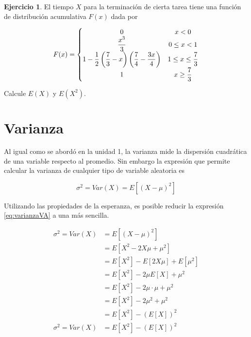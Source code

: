 \documentclass[
  11pt,
]{book}
\theoremstyle{definition}
\theoremstyle{definition}
\theoremstyle{definition}
\newtheorem{exercise}{Ejercicio}[chapter]
\theoremstyle{definition}
\theoremstyle{remark}
\begin{document}
\begin{exercise}
\protect\hypertarget{exr:exesperanza5}{}\label{exr:exesperanza5}El tiempo \(X\) para la terminación de cierta tarea tiene una función de distribución acumulativa \(F(x)\) dada por

\begin{equation}
\notag
F(x) = \left\lbrace
\begin{matrix}
0 & x < 0\\
\displaystyle\frac{x^3}{3} & 0 \leq x < 1\\
1-\displaystyle\frac{1}{2}\left(\displaystyle\frac{7}{3}-x \right)\left(\displaystyle\frac{7}{4}-\displaystyle\frac{3x}{4}\right) & 1\leq x \leq \displaystyle\frac{7}{3}\\
1 & x \geq \displaystyle\frac{7}{3}
\end{matrix}
\right.
\end{equation}

Calcule \(E(X)\) y \(E(X^2)\).
\end{exercise}

\section{Varianza}\label{varianza}

Al igual como se abordó en la unidad 1, la varianza mide la dispersión cuadrática de una variable respecto al promedio. Sin embargo la expresión que permite calcular la varianza de cualquier tipo de variable aleatoria es

\begin{equation}
\sigma^2 = Var(X) = E[(X-\mu)^2]
\label{eq:varianzaVA}
\end{equation}

Utilizando las propiedades de la esperanza, es posible reducir la expresión \eqref{eq:varianzaVA} a una más sencilla.

\begin{equation}
\begin{split}
\sigma^2 = Var(X) &= E[(X-\mu)^2]\\
&= E[X^2-2X\mu + \mu^2]\\
&= E[X^2]-E[2X\mu] + E[\mu^2]\\
&= E[X^2]-2\mu E[X] + \mu^2\\
&= E[X^2]-2\mu \cdot \mu + \mu^2\\
&= E[X^2]-2\mu^2 + \mu^2\\
&= E[X^2]-(E[X])^2\\
\sigma^2 = Var(X) &= E[X^2]-(E[X])^2\\
\end{split}
\label{eq:varianzaSimplificada}
\end{equation}
\end{document}
